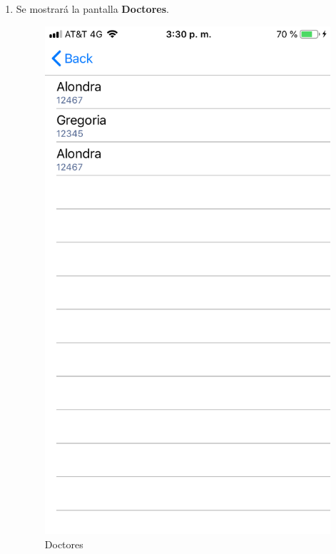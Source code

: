 \begin{enumerate}
	\item Se mostrará la pantalla \textbf{Doctores}. 
	\newpage
	\begin{figure}[!htbp]			
		\hypertarget{fig:Doctores}{\hspace{1pt}}
		\begin{center}
			\includegraphics[height=0.4\textheight]{Paciente/ConsultarDoctor/images/Doctores}
			\caption{Doctores}
			\label{fig:Doctores}
		\end{center}
	\end{figure}

	
\end{enumerate}

